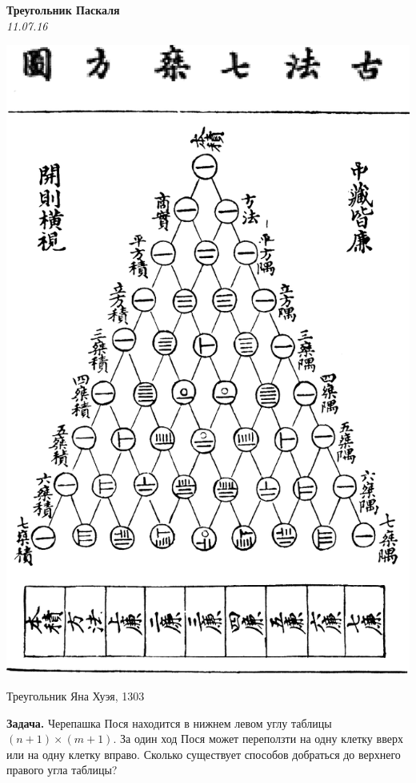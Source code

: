 \begin{center}
\textbf{\Large Треугольник Паскаля}\\
\textit{11.07.16}
\end{center}

\epigraph{\includegraphics[width=.8\textwidth]{Yanghui_triangle}}{Треугольник Яна Хуэя, 1303}

\textbf{Задача.} Черепашка Пося находится в нижнем левом углу таблицы $(n+1)\times (m+1)$. За один ход Пося может переползти на одну клетку вверх или на одну клетку вправо. Сколько существует способов добраться до верхнего правого угла таблицы?

